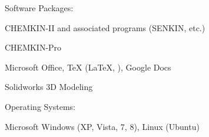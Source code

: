 \halfblankline

Software Packages:
%
\begin{innerlist}
    \item CHEMKIN-II and associated programs (SENKIN, etc.)
    \item CHEMKIN-Pro
    \item Microsoft Office, \TeX{} (\LaTeX{}, \BibTeX{}), Google Docs
    \item Solidworks 3D Modeling
\end{innerlist}

\halfblankline

Operating Systems:
%
\begin{innerlist}
    \item Microsoft Windows (XP, Vista, 7, 8), Linux (Ubuntu)
\end{innerlist}





